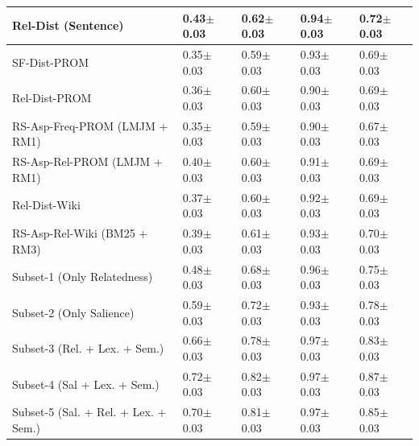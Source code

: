 \begin{table}[t]
\begin{tabular}{@{}lllll@{}}
      
      Rel-Dist (Sentence)  &    
      0.43$\pm$0.03 &
     0.62$\pm$0.03 &
      0.94$\pm$0.03 &
        0.72$\pm$0.03
      \\
       \midrule
      
    
      SF-Dist-PROM   &    
      0.35$\pm$0.03 &
      0.59$\pm$0.03 &
       0.93$\pm$0.03 &
        0.69$\pm$0.03
      \\
      
      
      Rel-Dist-PROM  &    
      0.36$\pm$0.03 &
      0.60$\pm$0.03 &
       0.90$\pm$0.03 &
        0.69$\pm$0.03
      \\
      
     
      RS-Asp-Freq-PROM (LMJM + RM1)  &     
      0.35$\pm$0.03 &
      0.59$\pm$0.03 &
       0.90$\pm$0.03 &
        0.67$\pm$0.03
      \\
      
       
      RS-Asp-Rel-PROM (LMJM + RM1) &     
      0.40$\pm$0.03 &
      0.60$\pm$0.03 &
       0.91$\pm$0.03 &
        0.69$\pm$0.03
      \\
       \midrule
      
      
      Rel-Dist-Wiki  &    
      0.37$\pm$0.03 &
      0.60$\pm$0.03 &
       0.92$\pm$0.03 &
        0.69$\pm$0.03
      \\
      
      
       
      RS-Asp-Rel-Wiki (BM25 + RM3)  &     
      0.39$\pm$0.03 &
      0.61$\pm$0.03 &
       0.93$\pm$0.03 &
        0.70$\pm$0.03
      \\
      \midrule
      
       Subset-1 (Only Relatedness) &
      0.48$\pm$0.03 &
      0.68$\pm$0.03 &
       0.96$\pm$0.03 &
        0.75$\pm$0.03
      \\
      
      
      Subset-2 (Only Salience) &
      0.59$\pm$0.03 &
      0.72$\pm$0.03 &
       0.93$\pm$0.03 &
        0.78$\pm$0.03
      \\
      
       Subset-3 (Rel. + Lex. + Sem.) &
      0.66$\pm$0.03 &
      0.78$\pm$0.03 &
       0.97$\pm$0.03 &
        0.83$\pm$0.03
      \\
      
       Subset-4 (Sal + Lex. + Sem.) &
      
      0.72$\pm$0.03 &
      0.82$\pm$0.03 &
       0.97$\pm$0.03 &
        0.87$\pm$0.03
      \\
      
      
      Subset-5 (Sal. + Rel. + Lex. + Sem.) &
      0.70$\pm$0.03 &
      0.81$\pm$0.03 &
       0.97$\pm$0.03 &
        0.85$\pm$0.03
      \\
     
      
      

     
      
       \bottomrule
    \end{tabular}
\end{table}






 

%


  